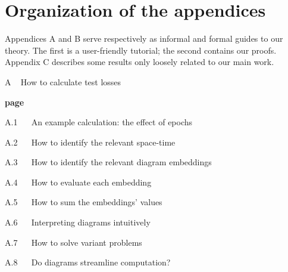 \documentclass[openany, notitlepage, justified]{tufte-book}
\theoremstyle{plain}
\theoremstyle{definition}
\begin{document}
       
 

\setcounter{secnumdepth}{-1}
    
    {
        
    }
    \restoregeometry
\setcounter{secnumdepth}{1}



\setcounter{chapter}{0}

\chapter*{Organization of the appendices}
    Appendices A and B serve respectively as informal and formal
    guides to our theory.  The first is a user-friendly tutorial; the second
    contains our proofs.  Appendix C describes some results only loosely
    related to our main work.\\

    {\bf
    \par\noindent A ~ How to calculate test losses}                         \hfill {\bf page \pageref{appendix:tutorial}}
    \par\indent     A.1 ~~ An example calculation: the effect of epochs     \hfill \pageref{appendix:example}
    \par\indent     A.2 ~~ How to identify the relevant space-time          \hfill \pageref{appendix:draw-spacetime} 
    \par\indent     A.3 ~~ How to identify the relevant diagram embeddings  \hfill \pageref{appendix:draw-embeddings}
    \par\indent     A.4 ~~ How to evaluate each embedding                   \hfill \pageref{appendix:evaluate-embeddings}
    \par\indent     A.5 ~~ How to sum the embeddings' values                \hfill \pageref{appendix:sum-embeddings}
    \par\indent     A.6 ~~ Interpreting diagrams intuitively                \hfill \pageref{appendix:interpret-diagrams}
    \par\indent     A.7 ~~ How to solve variant problems                    \hfill \pageref{appendix:solve-variants}
    \par\indent     A.8 ~~ Do diagrams streamline computation?              \hfill \pageref{appendix:diagrams-streamline}
\end{document}
